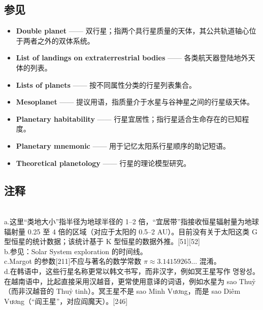 \subsection{参见}
\begin{itemize}
\item \textbf{Double planet} —— 双行星；指两个具行星质量的天体，其公共轨道轴心位于两者之外的双体系统。
\item \textbf{List of landings on extraterrestrial bodies} —— 各类航天器登陆地外天体的列表。
\item \textbf{Lists of planets} —— 按不同属性分类的行星列表集合。
\item \textbf{Mesoplanet} —— 提议用语，指质量介于水星与谷神星之间的行星级天体。
\item \textbf{Planetary habitability} —— 行星宜居性；指行星适合生命存在的已知程度。
\item \textbf{Planetary mnemonic} —— 用于记忆太阳系行星顺序的助记短语。
\item \textbf{Theoretical planetology} —— 行星的理论模型研究。
\end{itemize}
\subsection{注释}\\
a.这里“类地大小”指半径为地球半径的 1–2 倍，“宜居带”指接收恒星辐射量为地球辐射量 0.25 至 4 倍的区域（对应于太阳的 0.5–2 AU）。目前没有关于太阳这类 G 型恒星的统计数据；该统计基于 K 型恒星的数据外推。[51][52]\\
b.参见：Solar System exploration 的时间线。\\
c.Margot 的参数[211]不应与著名的数学常数 $\pi\approx 3.14159265\ldots$ 混淆。\\
d.在韩语中，这些行星名称更常以韩文书写，而非汉字，例如冥王星写作 명왕성。在越南语中，比起直接采用汉越音，更常使用意译的词语，例如水星为 sao Thuỷ（而非汉越音的 Thuỷ tinh）。冥王星不是 sao Minh Vương，而是 sao Diêm Vương（“阎王星”，对应阎魔天）。[246]
